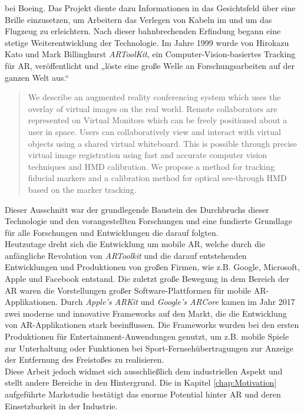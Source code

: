 bei Boeing. Das Projekt diente dazu Informationen in das Gesichtsfeld über eine Brille einzusetzen, um Arbeitern das Verlegen von Kabeln im und um das 
Flugzeug zu erleichtern. Nach dieser bahnbrechenden Erfindung begann eine stetige Weiterentwicklung der Technologie. Im Jahre 1999 wurde 
von Hirokazu Kato und Mark Billinghurst \textit{ARToolKit}, ein Computer-Vision-basiertes Tracking für AR, veröffentlicht und „löste eine 
große Welle an Forschungsarbeiten auf der ganzen Welt aus.“ \cite{springer.2019s} 
\begin{quote}
    We describe an augmented reality conferencing system which uses the overlay of virtual images on the real world. Remote collaborators 
    are represented on Virtual Monitors which can be freely positioned about a user in space. Users can collaboratively view and interact 
    with virtual objects using a shared virtual whiteboard. This is possible through precise virtual image registration using fast and 
    accurate computer vision techniques and HMD calibration. We propose a method for tracking fiducial markers and a calibration method 
    for optical see-through HMD based on the marker tracking. \cite{artoolkitsheet.1999o}
\end{quote}
Dieser Ausschnitt war der grundlegende Baustein des Durchbruchs dieser Technologie und den vorangestellten Forschungen und eine fundierte 
Grundlage für alle Forschungen und Entwicklungen die darauf folgten. 
\\ 
Heutzutage dreht sich die Entwicklung um mobile AR, welche durch die anfängliche Revolution von \textit{ARToolkit} und die darauf entstehenden 
Entwicklungen und Produktionen von großen Firmen, wie z.B. Google, Microsoft, Apple und Facebook entstand. Die zuletzt große Bewegung in dem 
Bereich der AR waren die Vorstellungen großer Software-Plattformen für mobile \acs{AR}-Applikationen. Durch \textit{Apple's ARKit} und \textit{Google's ARCore} 
kamen im Jahr 2017 zwei moderne und innovative Frameworks auf den Markt, die die Entwicklung von \acl{AR}-Applikationen stark beeinflussen.
Die Frameworks wurden bei den ersten Produktionen für Entertainment-Anwendungen genutzt, um z.B. mobile Spiele zur Unterhaltung oder 
Funktionen bei Sport-Fernsehübertragungen zur Anzeige der Entfernung des Freistoßes zu realisieren.
\\ 
\linebreak
Diese Arbeit jedoch widmet sich ausschließlich dem industriellen Aspekt und stellt andere Bereiche in den Hintergrund. Die in Kapitel 
\ref{chap:Motivation} aufgeführte Markstudie bestätigt das enorme Potential hinter \acl{AR} und deren Einsetzbarkeit in der Industrie.
